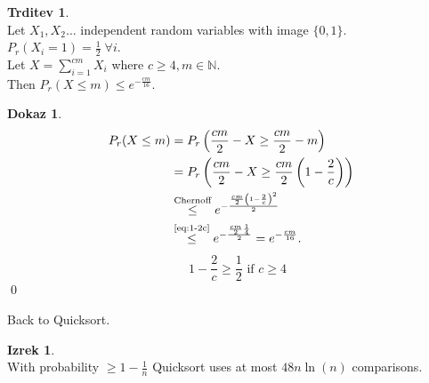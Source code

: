 \documentclass[a4paper, 12pt]{book}
\theoremstyle{definition}
\newtheorem{claim}[counter]{Trditev}
\newtheorem{theorem}[counter]{Izrek}
\newtheorem{pro}[counter]{Dokaz}
\theoremstyle{remark}
\begin{document}
\begin{claim} \text{} \\
  Let $X_1, X_2 \dots$ independent random variables with image $\{0,1\}$. \\
  $P_r(X_i = 1) = \frac{1}{2} \; \forall i$. \\
  Let $X = \sum_{i=1}^{cm} X_i$ where $c \geq 4, m \in \mathbb{N}$. \\
  Then $P_r(X \leq m) \leq e^{-\frac{cm}{16}}$.
\end{claim}
\begin{pro}
  \begin{align*}
    P_r(X \leq m) &= P_r\left(\frac{cm}{2} - X \geq \frac{cm}{2} - m\right) \\
    &= P_r\left(\frac{cm}{2} - X \geq \frac{cm}{2} \left(1 - \frac{2}{c}\right)\right) \\
    &\stackrel{\text{Chernoff}}{\leq} e^{-\frac{\frac{cm}{2} \left(1-\frac{2}{c}\right)^2}{2}} \\
    &\stackrel{\refeq{eq:1-2c}}{\leq} e^{-\frac{\frac{cm}{2} \frac{1}{4}}{2}} = e^{-\frac{cm}{16}}.
  \end{align*}
  \begin{equation}
    \label{eq:1-2c}
    \quad 1-\frac{2}{c} \geq \frac{1}{2} \text{ if } c \geq 4
  \end{equation}
  \qed
\end{pro}
Back to Quicksort.
\begin{theorem} \text{} \\
  With probability $\geq 1 - \frac{1}{n}$ Quicksort uses at most $48n\ln(n)$ comparisons.
\end{theorem}
\end{document}
